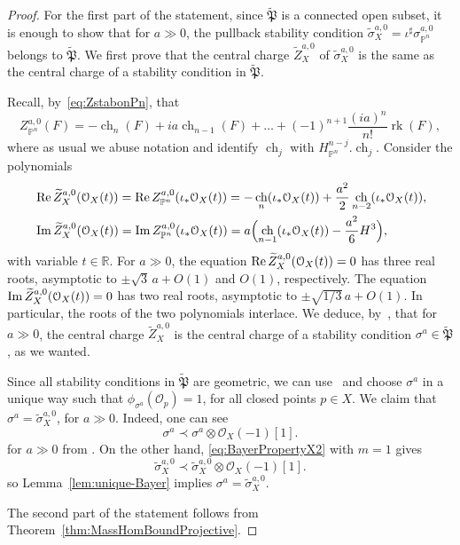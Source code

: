 \documentclass[11pt, reqno]{amsart}
\numberwithin{equation}{section}
\theoremstyle{plain}
\theoremstyle{remark}
\theoremstyle{definition}
\theoremstyle{italicsname}
\def\Re{\mathop{\rm Re}\nolimits}
\def\Im{\mathop{\rm Im}\nolimits}
\DeclareMathOperator{\ch}{{ch}}
\DeclareMathOperator{\rk}{{rk}}
\newcommand{\cO}{\mathcal{O}}
\def\PP{\ensuremath{\mathbb{P}}}
\begin{document}
\begin{proof}
For the first part of the statement, since $\widetilde{\mathfrak P}$ is a connected open subset, it is enough to show that for $a\gg 0$, the pullback stability condition $\widetilde{\sigma}_X^{a,0}=\iota^\sharp\sigma^{a,0}_{\PP^n}$ belongs to $\widetilde{\mathfrak P}$.
We first prove that the central charge $\widetilde{Z}_X^{a,0}$ of $\widetilde{\sigma}_X^{a,0}$ is the same as the central charge of a stability condition in $\widetilde{\mathfrak P}$.

Recall, by~\eqref{eq:ZstabonPn}, that
\[
Z^{a,0}_{\PP^n}(F)=-\ch_n(F)+ia\ch_{n-1}(F)+\dots+(-1)^{n+1}\frac{(ia)^n}{n!}\rk(F),
\]
where as usual we abuse notation and identify $\ch_j$ with $H_{\PP^n}^{n-j}.\ch_j$.
Consider the polynomials
\begin{align*}
&\Re \widetilde{Z}^{a,0}_X(\cO_X(t))=\Re Z^{a,0}_{\PP^n}(\iota_*\cO_X(t))=-\ch_n(\iota_*\cO_X(t))+\frac{a^2}{2}\ch_{n-2}(\iota_*\cO_X(t)),\\
&\Im \widetilde{Z}^{a,0}_X(\cO_X(t))=\Im Z^{a,0}_{\PP^n}(\iota_*\cO_X(t))=a\Bigl(\ch_{n-1}(\iota_*\cO_X(t))-\frac{a^2}{6}H^3\Bigr),
\end{align*}
with variable $t\in\mathbb R$.
For $a\gg 0$, the equation
$\Re\widetilde{Z}^{a,0}_X(\cO_X(t))=0$ has three real roots, asymptotic to
$\pm\sqrt{3}\,a+O(1)$ and $O(1)$, respectively. 
The equation
$\Im \widetilde{Z}^{a,0}_X(\cO_X(t))=0$ has two real roots, asymptotic to
$\pm\sqrt{1/3}\,a+O(1)$.
In particular, the roots of the two polynomials interlace. 
We deduce, by~\cite[Section 7]{Li:sb}, that for $a\gg0$, the central charge $\widetilde{Z}_X^{a,0}$ is the central charge of a stability condition $\sigma^a\in\widetilde{\mathfrak P}$, as we wanted.

Since all stability conditions in $\widetilde{\mathfrak P}$ are geometric, we can use~\cite[Lemma 8.3]{BMS:StabCY3s} and choose $\sigma^a$ in a unique way such that $\phi_{\sigma^a}(\cO_p)=1$, for all closed points $p\in X$.
We claim that $\sigma^a=\widetilde{\sigma}_X^{a,0}$, for $a\gg0$.
Indeed, one can see
\[ \sigma^a\prec\sigma^a\otimes\cO_X(-1)[1]. \]
for $a\gg0$ from \cite[Proposition 8.5(4)]{Li:sb}. On the other hand, \eqref{eq:BayerPropertyX2} with $m=1$ gives \[ \widetilde{\sigma}_X^{a,0} \prec \widetilde{\sigma}_X^{a,0}\otimes\cO_X(-1)[1]. \]
so Lemma~\ref{lem:unique-Bayer} implies $\sigma^a=\widetilde{\sigma}_X^{a,0}$. 

The second part of the statement follows from Theorem~\ref{thm:MassHomBoundProjective}.
\end{proof}
\end{document}
